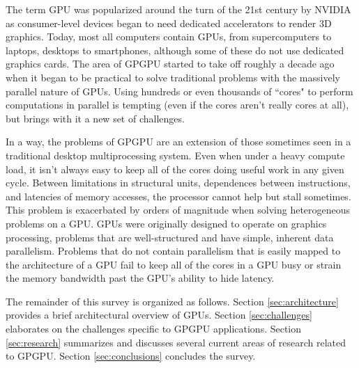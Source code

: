 \documentclass[prodmode,acmtecs]{acmsmall} %
\begin{document}
The term GPU was popularized around the turn of the 21st century by NVIDIA as
consumer-level devices began to need dedicated accelerators to render 3D
graphics. Today, most all computers contain GPUs, from supercomputers to
laptops, desktops to smartphones, although some of these do not use dedicated
graphics cards. The area of GPGPU started to take off roughly a decade ago when it began to be
practical to solve traditional problems with the massively parallel nature of
GPUs. Using hundreds or even thousands of ``cores" to perform computations in
parallel is tempting (even if the cores aren't really cores at all), but brings
with it a new set of challenges.

In a way, the problems of GPGPU are an extension of those sometimes seen in a
traditional desktop multiprocessing system. Even when under a heavy compute
load, it isn't always easy to keep all of the cores doing useful work in any
given cycle. Between limitations in structural units, dependences between
instructions, and latencies of memory accesses, the processor cannot help but
stall sometimes. This problem is exacerbated by orders of magnitude when solving
heterogeneous problems on a GPU. GPUs were originally designed to operate on
graphics processing, problems that are well-structured and have simple, inherent
data parallelism. Problems that do not contain parallelism that is easily mapped
to the architecture of a GPU fail to keep all of the cores in a GPU busy or
strain the memory bandwidth past the GPU's ability to hide latency.

The remainder of this survey is organized as follows. Section
\ref{sec:architecture} provides a brief architectural overview of GPUs. Section
\ref{sec:challenges} elaborates on the challenges specific to GPGPU
applications. Section \ref{sec:research} summarizes and discusses several
current areas of research related to GPGPU. Section \ref{sec:conclusions}
concludes the survey.

\end{document}
